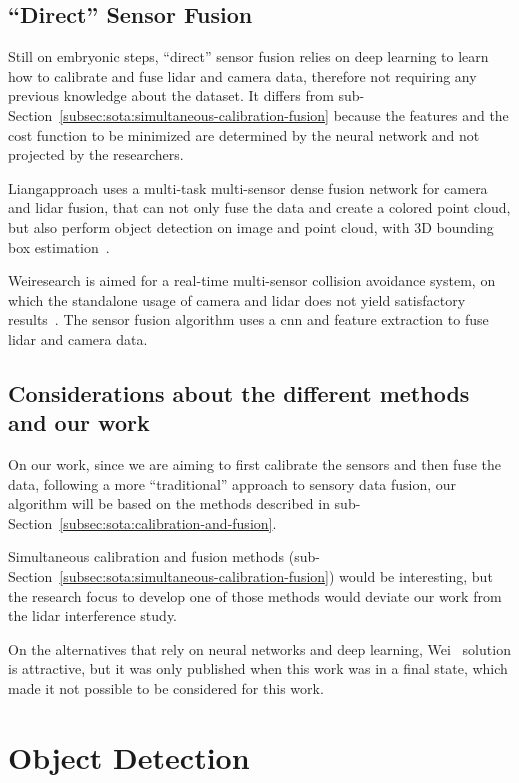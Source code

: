 \subsection{``Direct'' Sensor Fusion}
Still on embryonic steps, ``direct'' sensor fusion relies on deep learning to learn how to calibrate and fuse \ac{lidar} and camera data, therefore not requiring any previous knowledge about the dataset. It differs from sub-Section~\ref{subsec:sota:simultaneous-calibration-fusion} because the features and the cost function to be minimized are determined by the neural network and not projected by the researchers.

Liang\etal approach uses a multi-task multi-sensor dense fusion network for camera and \ac{lidar} fusion, that can not only fuse the data and create a colored point cloud, but also perform object detection on image and point cloud, with 3D bounding box estimation~\cite{Liang2019}.

Wei\etal research is aimed for a real-time multi-sensor collision avoidance system, on which the standalone usage of camera and \ac{lidar} does not yield satisfactory results~\cite{Wei2018}. The sensor fusion algorithm uses a \ac{cnn} and feature extraction to fuse \ac{lidar} and camera data. 

\subsection{Considerations about the different methods and our work}
On our work, since we are aiming to first calibrate the sensors and then fuse the data, following a more ``traditional'' approach to sensory data fusion, our algorithm will be based on the methods described in sub-Section~\ref{subsec:sota:calibration-and-fusion}. 

Simultaneous calibration and fusion methods (sub-Section~\ref{subsec:sota:simultaneous-calibration-fusion}) would be interesting, but the research focus to develop one of those methods would deviate our work from the \ac{lidar} interference study.

On the alternatives that rely on neural networks and deep learning, Wei\etal~\cite{Wei2018} solution is attractive, but it was only published when this work was in a final state, which made it not possible to be considered for this work.

\section{Object Detection}
\label{sec:sota:object-detection}

